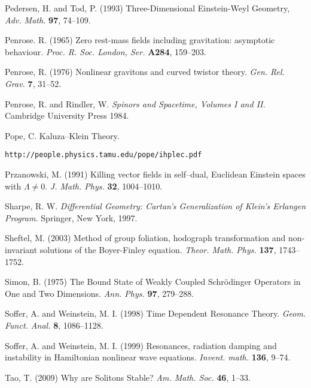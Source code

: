 \begin{thebibliography}{}
 Pedersen, H. and Tod, P. (1993)
Three-Dimensional Einstein-Weyl Geometry,
\textit{Adv. Math.} {\bf 97}, 74--109.

Penrose. R. (1965) Zero rest-mass fields including gravitation: asymptotic behaviour. \textit{Proc. R. 
Soc. London, Ser.} {\bf A284}, 159--203.

 Penrose, R. (1976) Nonlinear 
gravitons and curved twistor theory. \textit{Gen. Rel. Grav.}  {\bf 7},  31--52.

 Penrose, R. and Rindler, W.
\textit{Spinors and Spacetime, Volumes I and II.} Cambridge University Press 1984.

 Pope, C.
Kaluza--Klein Theory.

{\tt http://people.physics.tamu.edu/pope/ihplec.pdf}


 Przanowski, M. (1991)
Killing vector fields in self--dual, Euclidean Einstein spaces with $\Lambda\neq 0$.
\textit{J. Math. Phys.} {\bf 32}, 1004--1010.

 Sharpe, R. W.
\textit{Differential Geometry: Cartan's Generalization of Klein's Erlangen Program.} Springer, New York, 1997.

 Sheftel, M. (2003)
Method of group foliation, hodograph transformation and non-invariant solutions of the Boyer-Finley equation. \textit{Theor. Math. Phys.} {\bf 137}, 1743--1752.

 Simon, B. (1975)
The Bound State of Weakly Coupled Schr\"odinger Operators in One and Two Dimensions. \textit{Ann. Phys.} {\bf 97}, 279--288.


 Soffer, A. and Weinstein, M. I. (1998)
Time Dependent Resonance Theory. \textit{Geom. Funct. Anal.} {\bf 8}, 1086--1128.

 Soffer, A. and Weinstein, M. I. (1999)
Resonances, radiation damping and instability in Hamiltonian nonlinear wave equations. \textit{Invent. math.} {\bf 136}, 9--74.

 Tao, T. (2009)
Why are Solitons Stable? \textit{Am. Math. Soc.} {\bf 46}, 1--33.


\end{thebibliography}
